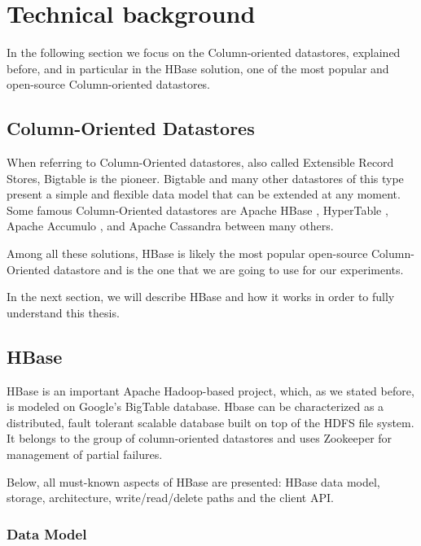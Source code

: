\chapter{Technical background}
\label{chapter:technical background} 

In the following section we focus on the Column-oriented datastores, explained before, and in particular in the HBase solution, one of the most popular and open-source Column-oriented datastores.

\section{Column-Oriented Datastores}

When referring to Column-Oriented datastores, also called Extensible Record Stores, Bigtable is the pioneer. Bigtable and many other datastores of this type present a simple and flexible data model that can be extended at any moment.
Some famous Column-Oriented datastores are Apache HBase \cite{ApacheHBase}, HyperTable \cite{HyperTable}, Apache Accumulo \cite{ApacheAccumulo}, and Apache Cassandra \cite{ApacheCassandra} between many others.
\par
Among all these solutions, HBase \cite{george2011hbase} is likely the most popular open-source Column-Oriented datastore and is the one that we are going to use for our experiments.
\par
In the next section, we will describe HBase and how it works in order to fully understand this thesis.


\section{HBase}


HBase is an important Apache Hadoop-based project, which, as we stated before, is modeled on Google's BigTable database. Hbase can be characterized as a distributed, fault tolerant scalable database built on top of the HDFS file system. It belongs to the group of column-oriented datastores and uses Zookeeper for management of partial failures.
\par
Below, all must-known aspects of HBase are presented: HBase data model, storage, architecture, write/read/delete paths and the client API.


\subsection{Data Model}

